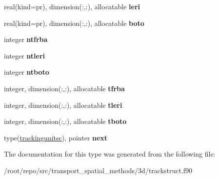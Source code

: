 \begin{DoxyCompactItemize}
\item 
\mbox{\label{structtracking__data__structures_1_1trackingunitsc_aa934ab0e755a0b93684a164d488a9dbc}} 
real(kind=pr), dimension(\+:,\+:), allocatable {\bfseries leri}
\item 
\mbox{\label{structtracking__data__structures_1_1trackingunitsc_a70abfc5a80da58e072279c907d938c58}} 
real(kind=pr), dimension(\+:,\+:), allocatable {\bfseries boto}
\item 
\mbox{\label{structtracking__data__structures_1_1trackingunitsc_aa012520bb3114f12330bab6dc622d65f}} 
integer {\bfseries ntfrba}
\item 
\mbox{\label{structtracking__data__structures_1_1trackingunitsc_afb75bfc5203ec62bc57bb4670cffd038}} 
integer {\bfseries ntleri}
\item 
\mbox{\label{structtracking__data__structures_1_1trackingunitsc_a598a46de00c6e997e911395a61e8b93f}} 
integer {\bfseries ntboto}
\item 
\mbox{\label{structtracking__data__structures_1_1trackingunitsc_ad62a2a789e69c13f7f40322f89303ac2}} 
integer, dimension(\+:,\+:), allocatable {\bfseries tfrba}
\item 
\mbox{\label{structtracking__data__structures_1_1trackingunitsc_af498c2cfd96a18df741805988a6d3ea5}} 
integer, dimension(\+:,\+:), allocatable {\bfseries tleri}
\item 
\mbox{\label{structtracking__data__structures_1_1trackingunitsc_a6b3cceaa9cf6b60ea0330fc48f3ab107}} 
integer, dimension(\+:,\+:), allocatable {\bfseries tboto}
\item 
\mbox{\label{structtracking__data__structures_1_1trackingunitsc_ad91a2408f427440a9f4a543bc5923a92}} 
type(\hyperlink{structtracking__data__structures_1_1trackingunitsc}{trackingunitsc}), pointer {\bfseries next}
\end{DoxyCompactItemize}


The documentation for this type was generated from the following file\+:\begin{DoxyCompactItemize}
\item 
/root/repo/src/transport\+\_\+spatial\+\_\+methods/3d/trackstruct.\+f90\end{DoxyCompactItemize}
